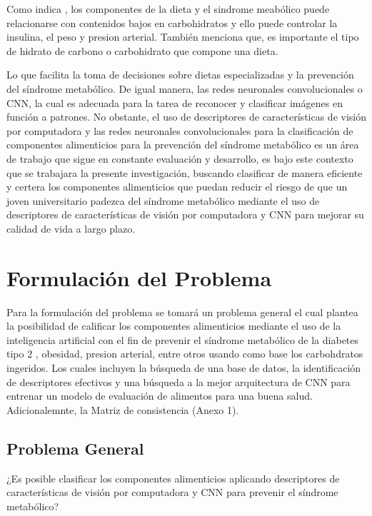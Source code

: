 Como indica \parencite{albornoz2012nutricion} , los componentes de la dieta y el sindrome meabólico puede relacionarse con contenidos bajos en carbohidratos y ello puede controlar la insulina, el peso y presion arterial. También menciona que, es importante el tipo de hidrato de carbono o carbohidrato que compone una dieta. 

Lo que facilita la toma de decisiones sobre dietas especializadas y la prevención del síndrome metabólico. De igual manera, las redes neuronales convolucionales o CNN, la cual es adecuada para la tarea de reconocer y clasificar imágenes en función a patrones. No obstante, el uso de descriptores de características de visión por computadora y las redes neuronales convolucionales para la clasificación de componentes alimenticios para la prevención del síndrome metabólico es un área de trabajo que sigue en constante evaluación y desarrollo, es bajo este contexto que se trabajara la presente investigación, buscando clasificar de manera eficiente y certera los componentes alimenticios que puedan reducir el riesgo de que un joven universitario padezca del síndrome metabólico mediante el uso de descriptores de características de visión por computadora y CNN para mejorar su calidad de vida a largo plazo.


\section{Formulación del Problema}

Para la formulación del problema se tomará un problema general el cual plantea la posibilidad de calificar los componentes alimenticios mediante el uso de la inteligencia artificial con el fin de prevenir el síndrome metabólico de la diabetes tipo 2 , obesidad, presion arterial, entre otros usando como base los carbohdratos ingeridos. Los cuales incluyen la búsqueda de una base de datos, la identificación de descriptores efectivos y una búsqueda a la mejor arquitectura de CNN para entrenar un modelo de evaluación de alimentos para una buena salud. Adicionalemnte, la Matriz de consistencia (Anexo 1). 

\subsection{Problema General}
\newcommand{\ProblemaGeneral}{
	¿Es posible clasificar los componentes alimenticios aplicando descriptores de características de visión por computadora y CNN para prevenir el síndrome metabólico?
}
\ProblemaGeneral

